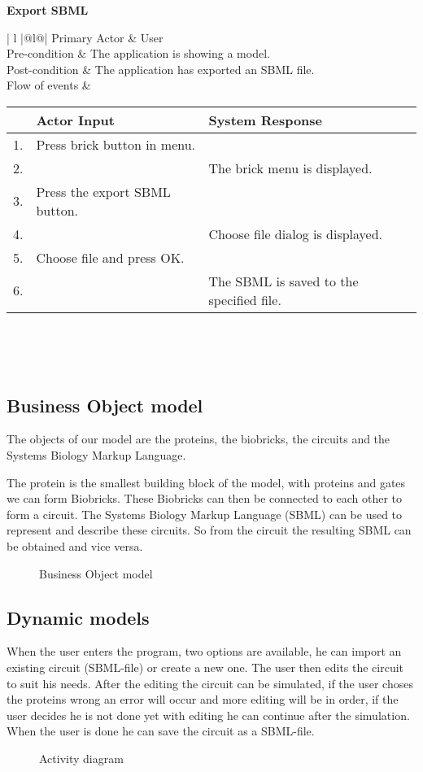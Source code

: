 \documentclass[a4paper]{article}
\begin{document}
{\bf Export SBML}\\
\begin{tabular}{ | l |@{}l@{}| } \hline
Primary Actor	& \; User \\  \hline
Pre-condition	& \; The application is showing a model. \\  \hline
Post-condition	& \; The application has exported an SBML file.	\\  \hline
Flow of events	& 
	\begin{tabular}{c | l | l}
	   & Actor Input 	& System Response 	\\  \hline
	1. & Press brick button in menu. &		\\  \hline
	2. & & The brick menu is displayed. 	\\  \hline
	3. & Press the export SBML button. &	\\  \hline
	4. & & Choose file dialog is displayed. \\  \hline
	5. & Choose file and press OK. &		\\  \hline
	6. & & The SBML is saved to the specified file. \\
	\end{tabular} \\ \hline
\end{tabular}\\

\pagebreak
\subsection{Business Object model} %
The objects of our model are the proteins, the biobricks, the circuits and the Systems Biology Markup Language.

The protein is the smallest building block of the model, with proteins and gates we can form Biobricks. These Biobricks can then be connected to each other to form a circuit. The Systems Biology Markup Language (SBML) can be used to represent and describe these circuits. So from the circuit the resulting SBML can be obtained and vice versa.
\begin{figure}[h!]
	\caption{Business Object model}
	\centering
\end{figure}

\subsection{Dynamic models}
When the user enters the program, two options are available, he can import an existing circuit (SBML-file) or create a new one. The user then edits the circuit to suit his needs. After the editing the circuit can be simulated, if the user choses the proteins wrong an error will occur and more editing will be in order, if the user decides he is not done yet with editing he can continue after the simulation. When the user is done he can save the circuit as a SBML-file.
\begin{figure}[h!]
	\caption{Activity diagram}
	\centering
\end{figure}
\pagebreak
\pagebreak
\end{document}
